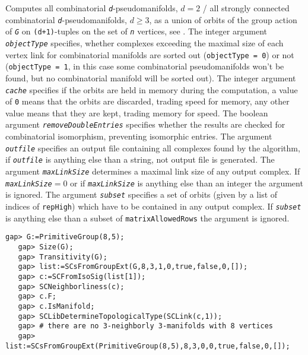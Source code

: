 \documentclass[a4paper,11pt]{report}
\begin{document}
{{{ Computes all combinatorial \mbox{\texttt{\mdseries\slshape d}}-pseudomanifolds, $d=2$ / all strongly connected combinatorial \mbox{\texttt{\mdseries\slshape d}}-pseudomanifolds, $d \geq 3$, as a union of orbits of the group action of \mbox{\texttt{\mdseries\slshape G}} on \texttt{(d+1)}-tuples on the set of \mbox{\texttt{\mdseries\slshape n}} vertices, see \cite{Lutz03TrigMnfFewVertVertTrans}. The integer argument \mbox{\texttt{\mdseries\slshape objectType}} specifies, whether complexes exceeding the maximal size of each vertex link
for combinatorial manifolds are sorted out (\texttt{objectType = 0}) or not (\texttt{objectType = 1}, in this case some combinatorial pseudomanifolds won't be found, but no
combinatorial manifold will be sorted out). The integer argument \mbox{\texttt{\mdseries\slshape cache}} specifies if the orbits are held in memory during the computation, a value of \texttt{0} means that the orbits are discarded, trading speed for memory, any other value
means that they are kept, trading memory for speed. The boolean argument \mbox{\texttt{\mdseries\slshape removeDoubleEntries}} specifies whether the results are checked for combinatorial isomorphism,
preventing isomorphic entries. The argument \mbox{\texttt{\mdseries\slshape outfile}} specifies an output file containing all complexes found by the algorithm, if \mbox{\texttt{\mdseries\slshape outfile}} is anything else than a string, not output file is generated. The argument \mbox{\texttt{\mdseries\slshape maxLinkSize}} determines a maximal link size of any output complex. If \mbox{\texttt{\mdseries\slshape maxLinkSize}}$=0$ or if \mbox{\texttt{\mdseries\slshape maxLinkSize}} is anything else than an integer the argument is ignored. The argument \mbox{\texttt{\mdseries\slshape subset}} specifies a set of orbits (given by a list of indices of \texttt{repHigh}) which have to be contained in any output complex. If \mbox{\texttt{\mdseries\slshape subset}} is anything else than a subset of \texttt{matrixAllowedRows} the argument is ignored. 
\begin{Verbatim}[commandchars=!@|,fontsize=\small,frame=single,label=Example]
   gap> G:=PrimitiveGroup(8,5);
   gap> Size(G);
   gap> Transitivity(G);
   gap> list:=SCsFromGroupExt(G,8,3,1,0,true,false,0,[]);
   gap> c:=SCFromIsoSig(list[1]);
   gap> SCNeighborliness(c); 
   gap> c.F;
   gap> c.IsManifold; 
   gap> SCLibDetermineTopologicalType(SCLink(c,1));
   gap> # there are no 3-neighborly 3-manifolds with 8 vertices
   gap> list:=SCsFromGroupExt(PrimitiveGroup(8,5),8,3,0,0,true,false,0,[]); 
   

\end{Verbatim}}}}
\end{document}
